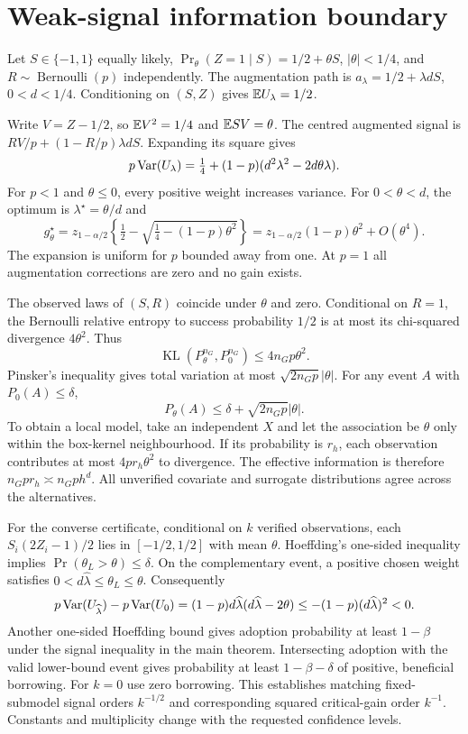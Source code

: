 \section{Weak-signal information boundary}
Let $S\in\{-1,1\}$ equally likely, $\Pr_\theta(Z=1\mid S)=1/2+\theta S$, $|\theta|<1/4$, and $R\sim\operatorname{Bernoulli}(p)$ independently. The augmentation path is $a_\lambda=1/2+\lambda dS$, $0<d<1/4$. Conditioning on $(S,Z)$ gives $\mathbb E U_\lambda=1/2$.

Write $V=Z-1/2$, so $\mathbb E V^2=1/4$ and $\mathbb E SV=\theta$. The centred augmented signal is $R V/p+(1-R/p)\lambda dS$. Expanding its square gives
\[
 p\operatorname{Var}(U_\lambda)=\tfrac14+(1-p)(d^2\lambda^2-2d\theta\lambda).
\]
For $p<1$ and $\theta\leq0$, every positive weight increases variance. For $0<\theta<d$, the optimum is $\lambda^\star=\theta/d$ and
\[
 g_\theta^\star=z_{1-\alpha/2}\left\{\tfrac12-
 \sqrt{\tfrac14-(1-p)\theta^2}\right\}
 =z_{1-\alpha/2}(1-p)\theta^2+O(\theta^4).
\]
The expansion is uniform for $p$ bounded away from one. At $p=1$ all augmentation corrections are zero and no gain exists.

The observed laws of $(S,R)$ coincide under $\theta$ and zero. Conditional on $R=1$, the Bernoulli relative entropy to success probability $1/2$ is at most its chi-squared divergence $4\theta^2$. Thus
\[
 \operatorname{KL}(P_\theta^{n_G},P_0^{n_G})\leq4n_Gp\theta^2.
\]
Pinsker's inequality gives total variation at most $\sqrt{2n_Gp}|\theta|$. For any event $A$ with $P_0(A)\leq\delta$,
\[
 P_\theta(A)\leq\delta+\sqrt{2n_Gp}|\theta|.
\]
To obtain a local model, take an independent $X$ and let the association be $\theta$ only within the box-kernel neighbourhood. If its probability is $r_h$, each observation contributes at most $4pr_h\theta^2$ to divergence. The effective information is therefore $n_Gpr_h\asymp n_Gph^d$. All unverified covariate and surrogate distributions agree across the alternatives.

For the converse certificate, conditional on $k$ verified observations, each $S_i(2Z_i-1)/2$ lies in $[-1/2,1/2]$ with mean $\theta$. Hoeffding's one-sided inequality implies $\Pr(\theta_L>\theta)\leq\delta$. On the complementary event, a positive chosen weight satisfies $0<d\widehat\lambda\leq\theta_L\leq\theta$. Consequently
\[
 p\operatorname{Var}(U_{\widehat\lambda})-p\operatorname{Var}(U_0)
 =(1-p)d\widehat\lambda(d\widehat\lambda-2\theta)
 \leq-(1-p)(d\widehat\lambda)^2<0.
\]
Another one-sided Hoeffding bound gives adoption probability at least $1-\beta$ under the signal inequality in the main theorem. Intersecting adoption with the valid lower-bound event gives probability at least $1-\beta-\delta$ of positive, beneficial borrowing. For $k=0$ use zero borrowing. This establishes matching fixed-submodel signal orders $k^{-1/2}$ and corresponding squared critical-gain order $k^{-1}$. Constants and multiplicity change with the requested confidence levels.

